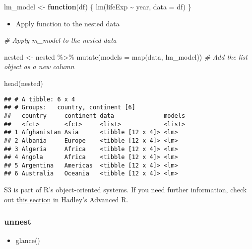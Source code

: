 \documentclass[
]{book}
\newenvironment{Shaded}{\begin{snugshade}}{\end{snugshade}}
\newcommand{\AttributeTok}[1]{\textcolor[rgb]{0.77,0.63,0.00}{#1}}
\newcommand{\CommentTok}[1]{\textcolor[rgb]{0.56,0.35,0.01}{\textit{#1}}}
\newcommand{\ControlFlowTok}[1]{\textcolor[rgb]{0.13,0.29,0.53}{\textbf{#1}}}
\newcommand{\FunctionTok}[1]{\textcolor[rgb]{0.00,0.00,0.00}{#1}}
\newcommand{\NormalTok}[1]{#1}
\newcommand{\OtherTok}[1]{\textcolor[rgb]{0.56,0.35,0.01}{#1}}
\newcommand{\SpecialCharTok}[1]{\textcolor[rgb]{0.00,0.00,0.00}{#1}}
\providecommand{\tightlist}{%
  \setlength{\itemsep}{0pt}\setlength{\parskip}{0pt}}
\begin{document}
\begin{Shaded}
\begin{Highlighting}[]
\NormalTok{lm\_model }\OtherTok{\textless{}{-}} \ControlFlowTok{function}\NormalTok{(df) \{}
  \FunctionTok{lm}\NormalTok{(lifeExp }\SpecialCharTok{\textasciitilde{}}\NormalTok{ year, }\AttributeTok{data =}\NormalTok{ df)}
\NormalTok{\}}
\end{Highlighting}
\end{Shaded}

\begin{itemize}
\tightlist
\item
  Apply function to the nested data
\end{itemize}

\begin{Shaded}
\begin{Highlighting}[]
\CommentTok{\# Apply m\_model to the nested data}

\NormalTok{nested }\OtherTok{\textless{}{-}}\NormalTok{ nested }\SpecialCharTok{\%\textgreater{}\%}
  \FunctionTok{mutate}\NormalTok{(}\AttributeTok{models =} \FunctionTok{map}\NormalTok{(data, lm\_model)) }\CommentTok{\# Add the list object as a new column}

\FunctionTok{head}\NormalTok{(nested)}
\end{Highlighting}
\end{Shaded}

\begin{verbatim}
## # A tibble: 6 x 4
## # Groups:   country, continent [6]
##   country     continent data              models
##   <fct>       <fct>     <list>            <list>
## 1 Afghanistan Asia      <tibble [12 x 4]> <lm>  
## 2 Albania     Europe    <tibble [12 x 4]> <lm>  
## 3 Algeria     Africa    <tibble [12 x 4]> <lm>  
## 4 Angola      Africa    <tibble [12 x 4]> <lm>  
## 5 Argentina   Americas  <tibble [12 x 4]> <lm>  
## 6 Australia   Oceania   <tibble [12 x 4]> <lm>
\end{verbatim}

S3 is part of R's object-oriented systems. If you need further information, check out \href{http://adv-r.had.co.nz/S3.html}{this section} in Hadley's Advanced R.

\hypertarget{unnest}{%
\subsubsection{unnest}\label{unnest}}

\begin{itemize}
\tightlist
\item
  glance()
\end{itemize}
\end{document}
